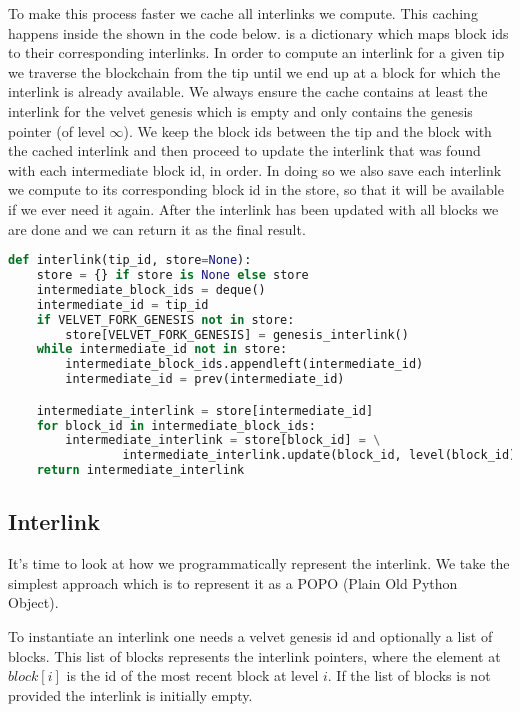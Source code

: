To make this process faster we cache all interlinks we compute. This caching happens inside the  shown in the code below.  is a dictionary which maps block ids to their corresponding interlinks. In order to compute an interlink for a given tip we traverse the blockchain from the tip until we end up at a block for which the interlink is already available. We always ensure the cache contains at least the interlink for the velvet genesis which is empty and only contains the genesis pointer (of level $\infty$). We keep the block ids between the tip and the block with the cached interlink and then proceed to update the interlink that was found with each intermediate block id, in order. In doing so we also save each interlink we compute to its corresponding block id in the store, so that it will be available if we ever need it again. After the interlink has been updated with all blocks we are done and we can return it as the final result.

\begin{lstlisting}[language=Python]
def interlink(tip_id, store=None):
    store = {} if store is None else store
    intermediate_block_ids = deque()
    intermediate_id = tip_id
    if VELVET_FORK_GENESIS not in store:
        store[VELVET_FORK_GENESIS] = genesis_interlink()
    while intermediate_id not in store:
        intermediate_block_ids.appendleft(intermediate_id)
        intermediate_id = prev(intermediate_id)

    intermediate_interlink = store[intermediate_id]
    for block_id in intermediate_block_ids:
        intermediate_interlink = store[block_id] = \
                intermediate_interlink.update(block_id, level(block_id))
    return intermediate_interlink
\end{lstlisting}

\subsection{Interlink}

It's time to look at how we programmatically represent the interlink. We take the simplest approach which is to represent it as a POPO (Plain Old Python Object).

To instantiate an interlink one needs a velvet genesis id and optionally a list of blocks. This list of blocks represents the interlink pointers, where the element at $block[i]$ is the id of the most recent block at level $i$. If the list of blocks is not provided the interlink is initially empty.

